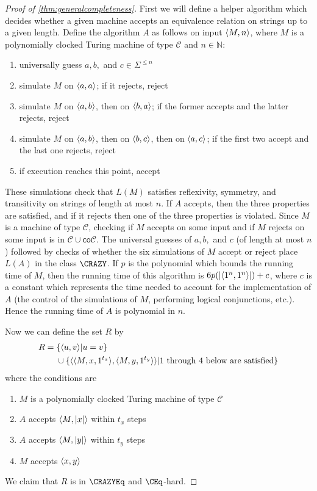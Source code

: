 \begin{proof}[Proof of \autoref{thm:generalcompleteness}]
  First we will define a helper algorithm which decides whether a given machine accepts an equivalence relation on strings up to a given length.
  Define the algorithm $A$ as follows on input $\langle M,n\rangle$, where $M$ is a polynomially clocked Turing machine of type $\mathcal{C}$ and $n\in\mathbb{N}$:
  \begin{enumerate}
  \item universally guess $a,b,$ and $c\in\Sigma^{\leq n}$
  \item simulate $M$ on $\langle a,a\rangle$; if it rejects, reject
  \item simulate $M$ on $\langle a,b\rangle$, then on $\langle b,a\rangle$; if the former accepts and the latter rejects, reject
  \item simulate $M$ on $\langle a,b\rangle$, then on $\langle b,c\rangle$, then on $\langle a,c\rangle$; if the first two accept and the last one rejects, reject
  \item if execution reaches this point, accept
  \end{enumerate}
  These simulations check that $L(M)$ satisfies reflexivity, symmetry, and transitivity on strings of length at most $n$.
  If $A$ accepts, then the three properties are satisfied, and if it rejects then one of the three properties is violated.
  Since $M$ is a machine of type $\mathcal{C}$, checking if $M$ accepts on some input and if $M$ rejects on some input is in $\mathcal{C}\cup\mathsf{co}\mathcal{C}$.
  The universal guesses of $a,b,$ and $c$ (of length at most $n$) followed by checks of whether the six simulations of $M$ accept or reject place $L(A)$ in the class $\CRAZY$.
  If $p$ is the polynomial which bounds the running time of $M$, then the running time of this algorithm is $6p(|\langle1^n,1^n\rangle|)+c$, where $c$ is a constant which represents the time needed to account for the implementation of $A$ (the control of the simulations of $M$, performing logical conjunctions, etc.).
  Hence the running time of $A$ is polynomial in $n$.

  Now we can define the set $R$ by
  \begin{align*}
    R = {} & \{\langle u,v\rangle|u=v\} \\
    & \cup \{\langle\langle M,x,1^{t_x}\rangle,\langle M,y,1^{t_y}\rangle\rangle |
    \text{1 through 4 below are satisfied}\}
  \end{align*}
  where the conditions are
  \begin{enumerate}
  \item\label{itm:machine} $M$ is a polynomially clocked Turing machine of type $\mathcal{C}$
  \item\label{itm:emx} $A$ accepts $\langle M,|x|\rangle$ within $t_x$ steps
  \item\label{itm:emy} $A$ accepts $\langle M,|y|\rangle$ within $t_y$ steps
  \item\label{itm:accepts} $M$ accepts $\langle x,y\rangle$
  \end{enumerate}
  We claim that $R$ is in $\CRAZYEq$ and $\CEq$-hard.


\end{proof}
